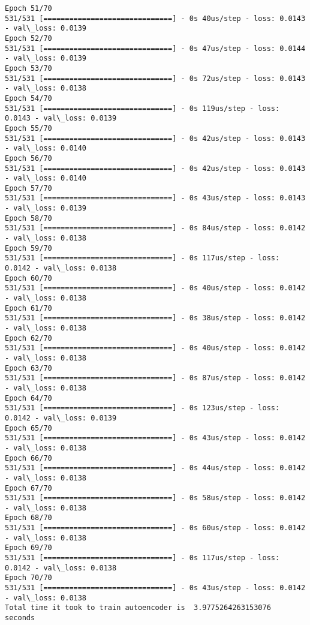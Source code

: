 \documentclass[11pt]{article}
\begin{document}
\begin{Verbatim}[commandchars=\\\{\}]
Epoch 51/70
531/531 [==============================] - 0s 40us/step - loss: 0.0143 - val\_loss: 0.0139
Epoch 52/70
531/531 [==============================] - 0s 47us/step - loss: 0.0144 - val\_loss: 0.0139
Epoch 53/70
531/531 [==============================] - 0s 72us/step - loss: 0.0143 - val\_loss: 0.0138
Epoch 54/70
531/531 [==============================] - 0s 119us/step - loss: 0.0143 - val\_loss: 0.0139
Epoch 55/70
531/531 [==============================] - 0s 42us/step - loss: 0.0143 - val\_loss: 0.0140
Epoch 56/70
531/531 [==============================] - 0s 42us/step - loss: 0.0143 - val\_loss: 0.0140
Epoch 57/70
531/531 [==============================] - 0s 43us/step - loss: 0.0143 - val\_loss: 0.0139
Epoch 58/70
531/531 [==============================] - 0s 84us/step - loss: 0.0142 - val\_loss: 0.0138
Epoch 59/70
531/531 [==============================] - 0s 117us/step - loss: 0.0142 - val\_loss: 0.0138
Epoch 60/70
531/531 [==============================] - 0s 40us/step - loss: 0.0142 - val\_loss: 0.0138
Epoch 61/70
531/531 [==============================] - 0s 38us/step - loss: 0.0142 - val\_loss: 0.0138
Epoch 62/70
531/531 [==============================] - 0s 40us/step - loss: 0.0142 - val\_loss: 0.0138
Epoch 63/70
531/531 [==============================] - 0s 87us/step - loss: 0.0142 - val\_loss: 0.0138
Epoch 64/70
531/531 [==============================] - 0s 123us/step - loss: 0.0142 - val\_loss: 0.0139
Epoch 65/70
531/531 [==============================] - 0s 43us/step - loss: 0.0142 - val\_loss: 0.0138
Epoch 66/70
531/531 [==============================] - 0s 44us/step - loss: 0.0142 - val\_loss: 0.0138
Epoch 67/70
531/531 [==============================] - 0s 58us/step - loss: 0.0142 - val\_loss: 0.0138
Epoch 68/70
531/531 [==============================] - 0s 60us/step - loss: 0.0142 - val\_loss: 0.0138
Epoch 69/70
531/531 [==============================] - 0s 117us/step - loss: 0.0142 - val\_loss: 0.0138
Epoch 70/70
531/531 [==============================] - 0s 43us/step - loss: 0.0142 - val\_loss: 0.0138
Total time it took to train autoencoder is  3.9775264263153076  seconds

    \end{Verbatim}
\end{document}
